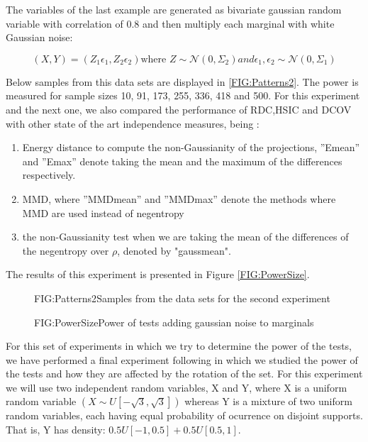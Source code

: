 The variables of the last example are generated as bivariate gaussian random variable with correlation of 0.8 and then multiply each marginal with white Gaussian noise:

$$(X,Y) = (Z_{1}\epsilon_{1},Z_{2}\epsilon_{2}) \text{where } Z\sim\mathcal{N}(0,\Sigma_{2}) and \epsilon_{1},\epsilon_{2}\sim\mathcal{N}(0,\Sigma_{1})$$

Below samples from this data sets are displayed in \ref{FIG:Patterns2}. The power is measured for sample sizes 10,  91, 173, 255, 336, 418 and 500. For this experiment and the next one, we also compared the performance of RDC,HSIC and DCOV with other state of the art independence measures, being : 

\begin{enumerate}
\item Energy distance to compute the non-Gaussianity of the projections, ”Emean” and ”Emax” denote taking the mean and the maximum of the differences respectively.
\item MMD, where ”MMDmean” and ”MMDmax” denote the methods where
MMD are used instead of negentropy
\item the non-Gaussianity test when we are taking the mean of the differences of the negentropy over $\rho$, denoted by "gaussmean".
\end{enumerate}

The results of this experiment is presented in Figure \ref{FIG:PowerSize}. 

\begin{figure}[Non linear dependance patterns example 2]{FIG:Patterns2}{Samples from the data sets for the second experiment}
\end{figure}

\begin{figure}[Power of tests increasing sample size]{FIG:PowerSize}{Power of tests adding gaussian noise to marginals}
\end{figure}

For this set of experiments in which we try to determine the power of the tests, we have performed a final experiment following \cite{Size} in which we studied the power of the tests and how they are affected by the rotation of the set.
For this experiment we will use two independent random variables, X and Y, where X is a uniform random variable $(X\sim U[-\sqrt{3},\sqrt{3}])$ whereas Y is a mixture of two uniform random variables, each having equal probability of ocurrence on disjoint supports. That is, Y has density: $0.5U[-1,0.5] + 0.5U[0.5,1]$.

